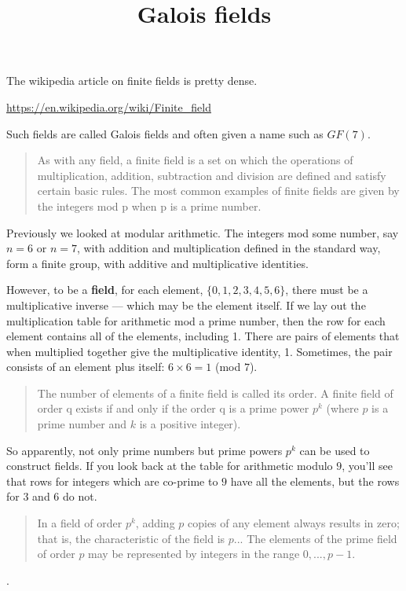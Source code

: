 \documentclass[11pt, oneside]{article}
\title{Galois fields}
\date{}
\begin{document}
\maketitle

\Large

The wikipedia article on finite fields is pretty dense.

\url{https://en.wikipedia.org/wiki/Finite_field}

Such fields are called Galois fields and often given a name such as $GF(7)$.

\begin{quote}As with any field, a finite field is a set on which the operations of multiplication, addition, subtraction and division are defined and satisfy certain basic rules. The most common examples of finite fields are given by the integers mod p when p is a prime number.\end{quote}

Previously we looked at modular arithmetic.  The integers mod some number, say $n = 6$ or $n = 7$, with addition and multiplication defined in the standard way, form a finite group, with additive and multiplicative identities.

However, to be a \textbf{field}, for each element, ${\{0,1,2,3,4,5,6\}}$, there must be a multiplicative inverse --- which may be the element itself.  If we lay out the multiplication table for arithmetic mod a prime number, then the row for each element contains all of the elements, including 1.  There are pairs of elements that when multiplied together give the multiplicative identity, 1.  Sometimes, the pair consists of an element plus itself:  $6 \times 6 = 1$ (mod $7$).

\begin{quote}The number of elements of a finite field is called its order. A finite field of order q exists if and only if the order q is a prime power $p^k$ (where $p$ is a prime number and $k$ is a positive integer).\end{quote}

So apparently, not only prime numbers but prime powers $p^k$ can be used to construct fields.  If you look back at the table for arithmetic modulo $9$, you'll see that rows for integers which are co-prime to $9$ have all the elements, but the rows for $3$ and $6$ do not.

\begin{quote}In a field of order $p^k$, adding $p$ copies of any element always results in zero; that is, the characteristic of the field is $p$... The elements of the prime field of order $p$ may be represented by integers in the range $0, ..., p-1$.\end{quote}.
\end{document}
